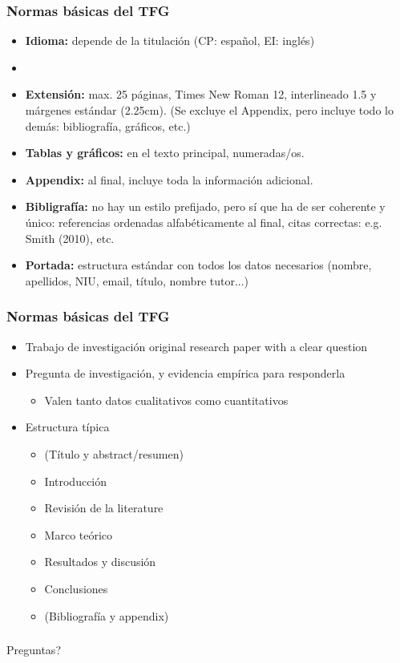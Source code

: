 \documentclass[utf8, xcolor=dvipsnames]{beamer}
\begin{document}
\begin{frame}
\frametitle{Normas básicas del TFG}
\centering

\begin{itemize}
  \item \textbf{Idioma:} depende de la titulación (CP: español, EI: inglés)
  \item[]
  \item \textbf{Extensión:} max. 25 páginas, Times New Roman 12, interlineado 1.5 y márgenes estándar (2.25cm). (Se excluye el Appendix, pero incluye todo lo demás: bibliografía, gráficos, etc.)
  \item \textbf{Tablas y gráficos:} en el texto principal, numeradas/os.
  \item \textbf{Appendix:} al final, incluye toda la información adicional.
  \item \textbf{Bibligrafía:} no hay un estilo prefijado, pero sí que ha de ser coherente y único: referencias ordenadas alfabéticamente al final, citas correctas: e.g. Smith (2010), etc.
  \item \textbf{Portada:} estructura estándar con todos los datos necesarios (nombre, apellidos, NIU, email, título, nombre tutor...)
\end{itemize}

\end{frame}

\begin{frame}
\frametitle{Normas básicas del TFG}
\centering

\begin{itemize}
  \item Trabajo de investigación original research paper with a clear question
  \item Pregunta de investigación, y evidencia empírica para responderla
  \begin{itemize}
    \item Valen tanto datos cualitativos como cuantitativos
  \end{itemize}
  \item Estructura típica
  \begin{itemize}
    \item (Título y abstract/resumen)
    \item Introducción
    \item Revisión de la literature
    \item Marco teórico
    \item Resultados y discusión
    \item Conclusiones
    \item (Bibliografía y appendix)
  \end{itemize}
\end{itemize}

\end{frame}

\begin{frame}
\frametitle{}
\centering

Preguntas?

\end{frame}
\end{document}
